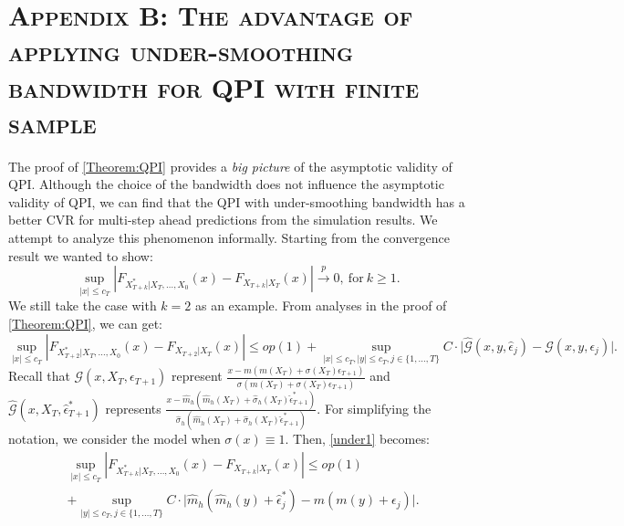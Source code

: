 \documentclass[a4paper]{article}
\begin{document}
\section*{\textsc{Appendix B: The advantage of applying under-smoothing bandwidth for QPI with finite sample}}\label{Appendix:advanQPI}
The proof of \cref{Theorem:QPI} provides a \textit{big picture} of the asymptotic validity of QPI. Although the choice of the bandwidth does not influence the asymptotic validity of QPI, we can find that the QPI with under-smoothing bandwidth has a better CVR for multi-step ahead predictions from the simulation results.
We attempt to analyze this phenomenon informally. Starting from the convergence result we wanted to show:
\begin{equation}\label{claim1_appendix}
    \sup_{|x|\leq c_{T}}\left| F_{X^*_{T+k}|X_T,\ldots,X_0}(x) -  F_{X_{T+k}|X_T}(x)\right| \overset{p}{\to} 0,~\text{for}~k \geq 1.\end{equation}
We still take the case with $k = 2$ as an example. From analyses in the proof of \cref{Theorem:QPI}, we can get:
\begin{equation}\label{under1}
    \sup_{|x|\leq c_{T}}\left| F_{X^*_{T+2}|X_T,\ldots,X_0}(x) -  F_{X_{T+2}|X_T}(x)\right| \leq op(1) + \sup_{|x|\leq c_T, |y|\leq c_T,j\in\{1,\ldots,T\}} C\cdot\bigg\vert  \widehat{\mathcal{G}}(x,y,\hat{\epsilon}_j) - \mathcal{G}(x,y,\epsilon_j)   \bigg\vert.
\end{equation}
Recall that $\mathcal{G}(x,X_T,\epsilon_{T+1}) $ represent $\frac{x - m(m(X_{T})+\sigma(X_{T})\epsilon_{T+1})}{\sigma(m(X_{T})+\sigma(X_{T})\epsilon_{T+1})}$ and $\widehat{\mathcal{G}}(x, X_T,\hat{\epsilon}^*_{T+1})$ represents $\frac{x - \widehat{m}_h(\widehat{m}_h(X_T)+\widehat{\sigma}_h(X_T)\hat{\epsilon}^*_{T+1})}{\widehat{\sigma}_h(\widehat{m}_h(X_T)+\widehat{\sigma}_h(X_T)\hat{\epsilon}^*_{T+1})}$. For simplifying the notation, we consider the model when $\sigma(x) \equiv 1$. Then, \cref{under1} becomes:
\begin{equation}
\begin{split}
    &\sup_{|x|\leq c_{T}}\left| F_{X^*_{T+k}|X_T,\ldots,X_0}(x) -  F_{X_{T+k}|X_T}(x)\right| \leq op(1) \\
    &+ \sup_{|y|\leq c_T,j\in\{1,\ldots,T\}} C\cdot\bigg\vert  \widehat{m}_h(\widehat{m}_h(y)+\hat{\epsilon}^*_{j}) - m(m(y)+\epsilon_{j})\bigg\vert.
\end{split}
\end{equation}
\end{document}
